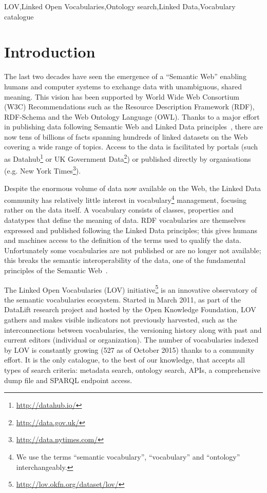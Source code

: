 \documentclass{iosart2c}
\begin{document}
\begin{frontmatter}
\begin{abstract}
\end{abstract}

\begin{keyword}
LOV\sep Linked Open Vocabularies\sep Ontology search\sep Linked Data\sep Vocabulary catalogue
\end{keyword}

\end{frontmatter}

\section{Introduction}
The last two decades have seen the emergence of a ``Semantic Web'' enabling humans and computer systems to exchange data with unambiguous, shared meaning. This vision has been supported by World Wide Web Consortium (W3C) Recommendations such as the Resource Description Framework (RDF), RDF-Schema and the Web Ontology Language (OWL). Thanks to a major effort in publishing data following Semantic Web and Linked Data principles~\cite{timld}, there are now tens of billions of facts spanning hundreds of linked datasets on the Web covering a wide range of topics. Access to the data is facilitated by portals (such as Datahub\footnote{\url{http://datahub.io/}} or UK Government Data\footnote{\url{http://data.gov.uk/}}) or published directly by organisations (e.g. New York Times\footnote{\url{http://data.nytimes.com/}}). 

Despite the enormous volume of data now available on the Web, the Linked Data community has relatively little interest in vocabulary\footnote{We use the terms ``semantic vocabulary'', ``vocabulary'' and ``ontology'' interchangeably.} management, focusing rather on the data itself. A vocabulary consists of classes, properties and datatypes that define the meaning of data. RDF vocabularies are themselves expressed and published following the Linked Data principles; this gives humans and machines access to the definition of the terms used to qualify the data. Unfortunately some vocabularies are not published or are no longer not available; this breaks the semantic interoperability of the data, one of the fundamental principles of the Semantic Web~\cite{janowicz2014five}.

The Linked Open Vocabularies (LOV) initiative\footnote{\url{http://lov.okfn.org/dataset/lov/}} is an innovative observatory of the semantic vocabularies ecosystem. Started in March 2011, as part of the DataLift research project \cite{scharffe_2012} and hosted by the Open Knowledge Foundation, LOV gathers and makes visible  indicators not previously harvested, such as the interconnections between vocabularies, the versioning history along with past and current editors  (individual or organization). The number of vocabularies indexed by LOV is constantly growing (527 as of October 2015) thanks to a community effort. It is the only catalogue, to the best of our knowledge, that accepts all types of search criteria: metadata search, ontology search, APIs, a comprehensive dump file and SPARQL endpoint access. 
\end{document}
